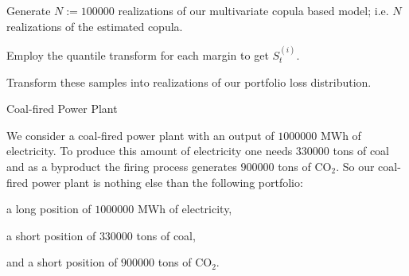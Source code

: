 	Generate $N:=100000$ realizations of our multivariate copula
based model; i.e. $N$ realizations of the estimated copula.

	
Employ the quantile transform for each margin to get $S_t^{(i)}$.


	Transform these samples into realizations of our portfolio
loss distribution.






{Coal-fired Power Plant}

We consider a coal-fired power plant with an output of $1000000$
MWh of electricity. To produce this amount of electricity one
needs $330000$ tons of coal and as a byproduct the firing process
generates $900000$ tons of CO$_2$. So our coal-fired power plant
is nothing else than the following portfolio:


	a long position of $1000000$ MWh of electricity,


	a short position of $330000$ tons of coal,


	and a short position of $900000$ tons of CO$_2$.

